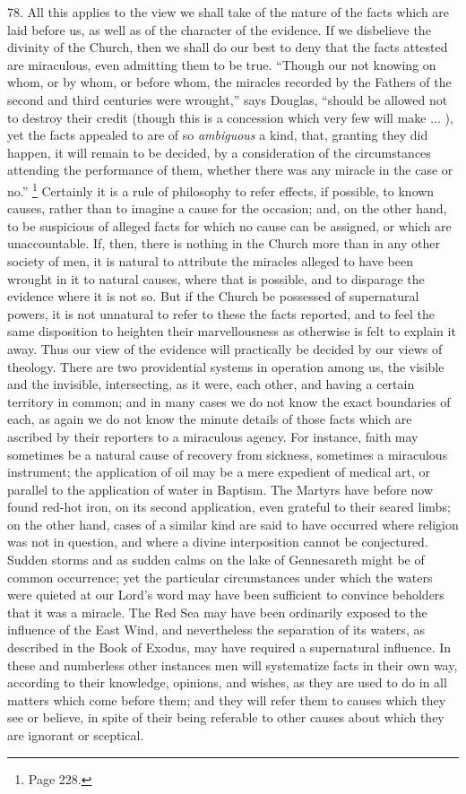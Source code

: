 78.
All this applies to the view we shall take of the nature of the facts
which are laid before us, as well as of the character of the evidence.
If we disbelieve the divinity of the Church, then we shall do our best
to deny that the facts attested are miraculous, even admitting
them to be true. ``Though our not knowing on whom, or by whom, or
before whom, the miracles recorded by the Fathers of the second and
third centuries were wrought,'' says Douglas, ``should be allowed not to
destroy their credit (though this is a concession which very few will
make ... ), yet the facts appealed to are of so \emph{ambiguous} a kind,
that, granting they did happen, it will remain to be decided, by a
consideration of the circumstances attending the performance of them,
whether there was any miracle in the case or no.'' \footnote{Page 228.} Certainly it is a rule of philosophy to refer effects, if
possible, to known causes, rather than to imagine a cause for the
occasion; and, on the other hand, to be suspicious of alleged facts
for which no cause can be assigned, or which are unaccountable. If,
then, there is nothing in the Church more than in any other society of
men, it is natural to attribute the miracles alleged to have been
wrought in it to natural causes, where that is possible, and to
disparage the evidence where it is not so. But if the Church be
possessed of supernatural powers, it is not unnatural to refer to
these the facts reported, and to feel the same disposition to heighten
their marvellousness as otherwise is felt to explain it away. Thus our
view of the evidence will practically be decided by our views of
theology. There are two providential systems in operation among us,
the visible and the invisible, intersecting, as it were, each
other, and having a certain territory in common; and in many cases we
do not know the exact boundaries of each, as again we do not know the
minute details of those facts which are ascribed by their reporters to
a miraculous agency. For instance, faith may sometimes be a natural
cause of recovery from sickness, sometimes a miraculous instrument;
the application of oil may be a mere expedient of medical art, or
parallel to the application of water in Baptism. The Martyrs have
before now found red-hot iron, on its second application, even
grateful to their seared limbs; on the other hand, cases of a similar
kind are said to have occurred where religion was not in question, and
where a divine interposition cannot be conjectured. Sudden storms and
as sudden calms on the lake of Gennesareth might be of common
occurrence; yet the particular circumstances under which the waters
were quieted at our Lord's word may have been sufficient to convince
beholders that it was a miracle. The Red Sea may have been ordinarily
exposed to the influence of the East Wind, and nevertheless the
separation of its waters, as described in the Book of Exodus, may have
required a supernatural influence. In these and numberless other
instances men will systematize facts in their own way, according to
their knowledge, opinions, and wishes, as they are used to do in all
matters which come before them; and they will refer them to causes which they see or believe, in spite of their being referable to
other causes about which they are ignorant or sceptical.

